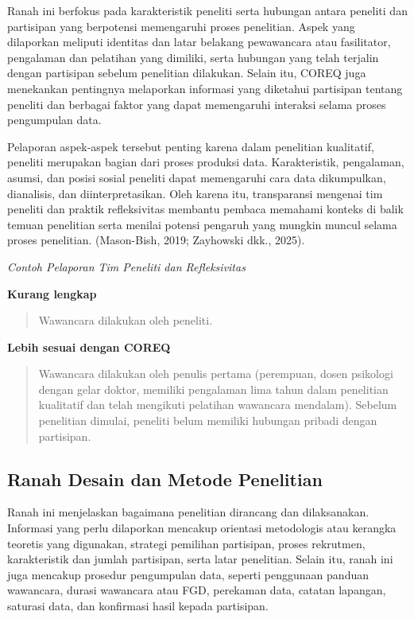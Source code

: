 \documentclass[
  indonesian,
  letterpaper,
  DIV=11,
  numbers=noendperiod]{scrreprt}
\begin{document}
Ranah ini berfokus pada karakteristik peneliti serta hubungan antara
peneliti dan partisipan yang berpotensi memengaruhi proses penelitian.
Aspek yang dilaporkan meliputi identitas dan latar belakang pewawancara
atau fasilitator, pengalaman dan pelatihan yang dimiliki, serta hubungan
yang telah terjalin dengan partisipan sebelum penelitian dilakukan.
Selain itu, COREQ juga menekankan pentingnya melaporkan informasi yang
diketahui partisipan tentang peneliti dan berbagai faktor yang dapat
memengaruhi interaksi selama proses pengumpulan data.

Pelaporan aspek-aspek tersebut penting karena dalam penelitian
kualitatif, peneliti merupakan bagian dari proses produksi data.
Karakteristik, pengalaman, asumsi, dan posisi sosial peneliti dapat
memengaruhi cara data dikumpulkan, dianalisis, dan diinterpretasikan.
Oleh karena itu, transparansi mengenai tim peneliti dan praktik
refleksivitas membantu pembaca memahami konteks di balik temuan
penelitian serta menilai potensi pengaruh yang mungkin muncul selama
proses penelitian. (Mason-Bish, 2019; Zayhowski dkk., 2025).

\emph{Contoh Pelaporan Tim Peneliti dan Refleksivitas}

\textbf{Kurang lengkap}

\begin{quote}
Wawancara dilakukan oleh peneliti.
\end{quote}

\textbf{Lebih sesuai dengan COREQ}

\begin{quote}
Wawancara dilakukan oleh penulis pertama (perempuan, dosen psikologi
dengan gelar doktor, memiliki pengalaman lima tahun dalam penelitian
kualitatif dan telah mengikuti pelatihan wawancara mendalam). Sebelum
penelitian dimulai, peneliti belum memiliki hubungan pribadi dengan
partisipan.
\end{quote}

\subsection{Ranah Desain dan Metode
Penelitian}\label{ranah-desain-dan-metode-penelitian}

Ranah ini menjelaskan bagaimana penelitian dirancang dan dilaksanakan.
Informasi yang perlu dilaporkan mencakup orientasi metodologis atau
kerangka teoretis yang digunakan, strategi pemilihan partisipan, proses
rekrutmen, karakteristik dan jumlah partisipan, serta latar penelitian.
Selain itu, ranah ini juga mencakup prosedur pengumpulan data, seperti
penggunaan panduan wawancara, durasi wawancara atau FGD, perekaman data,
catatan lapangan, saturasi data, dan konfirmasi hasil kepada partisipan.
\end{document}
